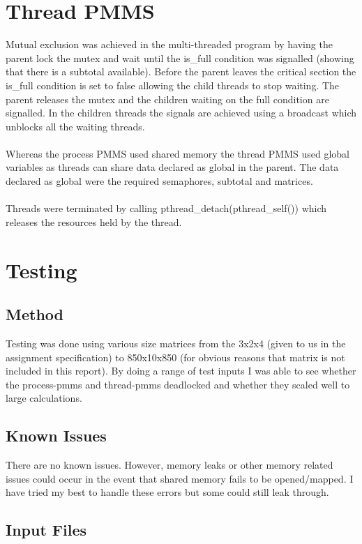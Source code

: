\documentclass{article}
\begin{document}
\section{Thread PMMS}
Mutual exclusion was achieved in the multi-threaded program by having the
parent lock the mutex and wait until the is\_full condition was signalled
(showing that there is a subtotal available). Before the parent leaves the
critical section the is\_full condition is set to false allowing the child
threads to stop waiting. The parent releases the mutex and the children waiting
on the full condition are signalled. In the children threads the signals are
achieved using a broadcast which unblocks all the waiting threads.
\\\\
Whereas the process PMMS used shared memory the thread PMMS used global
variables as threads can share data declared as global in the parent. The data
declared as global were the required semaphores, subtotal and matrices.
\\\\
Threads were terminated by calling pthread\_detach(pthread\_self()) which
releases the resources held by the thread.

\section{Testing}

\subsection{Method}
Testing was done using various size matrices from the 3x2x4 (given to us in the
assignment specification) to 850x10x850 (for obvious reasons that matrix is not
included in this report). By doing a range of test inputs I was able to see
whether the process-pmms and thread-pmms deadlocked and whether they scaled well
to large calculations.
\subsection{Known Issues}
There are no known issues. However, memory leaks or other memory related issues
could occur in the event that shared memory fails to be opened/mapped. I have
tried my best to handle these errors but some could still leak through.
\subsection{Input Files}
        \hangindent
\end{document}
